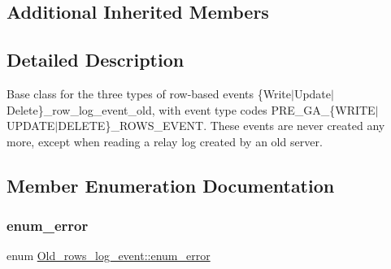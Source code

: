 \subsection*{Additional Inherited Members}


\subsection{Detailed Description}
Base class for the three types of row-\/based events \{Write$\vert$\+Update$\vert$\+Delete\}\+\_\+row\+\_\+log\+\_\+event\+\_\+old, with event type codes P\+R\+E\+\_\+\+G\+A\+\_\+\{W\+R\+I\+T\+E$\vert$\+U\+P\+D\+A\+T\+E$\vert$\+D\+E\+L\+E\+TE\}\+\_\+\+R\+O\+W\+S\+\_\+\+E\+V\+E\+NT. These events are never created any more, except when reading a relay log created by an old server. 

\subsection{Member Enumeration Documentation}
\mbox{\label{classOld__rows__log__event_a7ef5d5a72b26be925a98b215280cffd5}} 
\subsubsection{\texorpdfstring{enum\+\_\+error}{enum\_error}}
{\footnotesize\ttfamily enum \mbox{\hyperlink{classOld__rows__log__event_a7ef5d5a72b26be925a98b215280cffd5}{Old\+\_\+rows\+\_\+log\+\_\+event\+::enum\+\_\+error}}}

